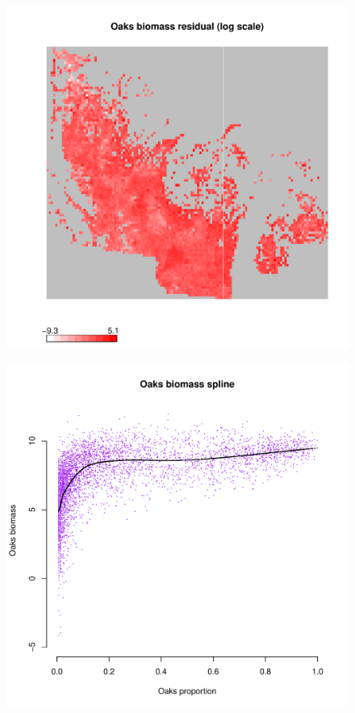 \documentclass[authoryear, review, 11pt]{elsarticle}
\begin{document}
\begin{figure}
	\begin{center}
	\includegraphics[width=5in]{../../figures/Oaks-biomass-residual.pdf}
	\caption{\label{fig:oaks-biomass-residual}}
	\end{center}
\end{figure}

\begin{figure}
	\begin{center}
	\includegraphics[width=5in]{../../figures/Oaks-biomass-spline.pdf}
	\caption{\label{fig:oaks-biomass-spline}}
	\end{center}
\end{figure}
\end{document}
